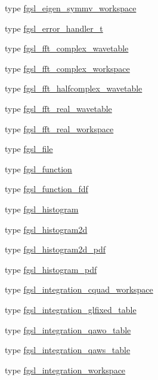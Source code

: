 \begin{DoxyCompactItemize}
\item 
type \hyperlink{structfgsl_1_1fgsl__eigen__symmv__workspace}{fgsl\+\_\+eigen\+\_\+symmv\+\_\+workspace}
\item 
type \hyperlink{structfgsl_1_1fgsl__error__handler__t}{fgsl\+\_\+error\+\_\+handler\+\_\+t}
\item 
type \hyperlink{structfgsl_1_1fgsl__fft__complex__wavetable}{fgsl\+\_\+fft\+\_\+complex\+\_\+wavetable}
\item 
type \hyperlink{structfgsl_1_1fgsl__fft__complex__workspace}{fgsl\+\_\+fft\+\_\+complex\+\_\+workspace}
\item 
type \hyperlink{structfgsl_1_1fgsl__fft__halfcomplex__wavetable}{fgsl\+\_\+fft\+\_\+halfcomplex\+\_\+wavetable}
\item 
type \hyperlink{structfgsl_1_1fgsl__fft__real__wavetable}{fgsl\+\_\+fft\+\_\+real\+\_\+wavetable}
\item 
type \hyperlink{structfgsl_1_1fgsl__fft__real__workspace}{fgsl\+\_\+fft\+\_\+real\+\_\+workspace}
\item 
type \hyperlink{structfgsl_1_1fgsl__file}{fgsl\+\_\+file}
\item 
type \hyperlink{structfgsl_1_1fgsl__function}{fgsl\+\_\+function}
\item 
type \hyperlink{structfgsl_1_1fgsl__function__fdf}{fgsl\+\_\+function\+\_\+fdf}
\item 
type \hyperlink{structfgsl_1_1fgsl__histogram}{fgsl\+\_\+histogram}
\item 
type \hyperlink{structfgsl_1_1fgsl__histogram2d}{fgsl\+\_\+histogram2d}
\item 
type \hyperlink{structfgsl_1_1fgsl__histogram2d__pdf}{fgsl\+\_\+histogram2d\+\_\+pdf}
\item 
type \hyperlink{structfgsl_1_1fgsl__histogram__pdf}{fgsl\+\_\+histogram\+\_\+pdf}
\item 
type \hyperlink{structfgsl_1_1fgsl__integration__cquad__workspace}{fgsl\+\_\+integration\+\_\+cquad\+\_\+workspace}
\item 
type \hyperlink{structfgsl_1_1fgsl__integration__glfixed__table}{fgsl\+\_\+integration\+\_\+glfixed\+\_\+table}
\item 
type \hyperlink{structfgsl_1_1fgsl__integration__qawo__table}{fgsl\+\_\+integration\+\_\+qawo\+\_\+table}
\item 
type \hyperlink{structfgsl_1_1fgsl__integration__qaws__table}{fgsl\+\_\+integration\+\_\+qaws\+\_\+table}
\item 
type \hyperlink{structfgsl_1_1fgsl__integration__workspace}{fgsl\+\_\+integration\+\_\+workspace}

\end{DoxyCompactItemize}
